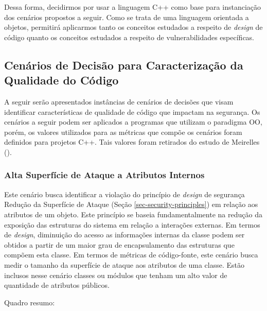 Dessa forma, decidirmos por usar a linguagem C++ como base para instanciação dos cenários propostos a seguir. Como se trata de uma linguagem orientada a objetos, permitirá aplicarmos tanto os conceitos estudados a respeito de \emph{design} de código quanto os conceitos estudados a respeito de vulnerabilidades específicas.

\subsection{Cenários de Decisão para Caracterização da Qualidade do Código }

A seguir serão apresentados instâncias de cenários de decisões que visam identificar características de qualidade de código que impactam na segurança. Os cenários a seguir podem ser aplicados a programas que utilizam o paradigma OO, porém, os valores utilizados para as métricas que compõe os cenários foram definidos para projetos C++. Tais valores foram retirados do estudo de Meirelles (\citeyear{meirelles2013metrics}).

\subsubsection{Alta Superfície de Ataque a Atributos Internos}

Este cenário busca identificar a violação do princípio de \emph{design} de segurança Redução da Superfície de Ataque (Seção \ref{sec-security-principles}) em relação aos atributos de um objeto. 
%
Este princípio se baseia fundamentalmente na redução da exposição das estruturas do sistema em relação a interações externas. Em termos de \emph{design}, diminuição do acesso as informações internas da classe podem ser obtidos a partir de um maior grau de encapsulamento das estruturas que compõem esta classe. 
%
Em termos de métricas de código-fonte, este cenário busca medir o tamanho da superfície de ataque aos atributos de uma classe. Estão inclusos nesse cenário classes ou módulos que tenham um alto valor de quantidade de atributos públicos. 

%

Quadro resumo:

